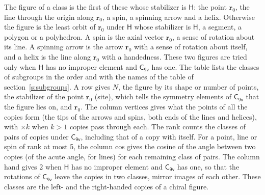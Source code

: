 \documentclass[10pt,a4paper]{article}
\numberwithin{equation}{section}
\newcommand{\grp}[1]{\mathsf{#1}}
\newcommand{\pointr}{\mathbf{r}}
\begin{document}
\leavevmode\label{n:head.figure}The figure of a class is the first of these whose stabilizer is $\grp{H}$: the point $\pointr_0$, the line through the origin along $\pointr_0$, a spin, a spinning arrow and a helix. Otherwise the figure is the least orbit of $\pointr_0$ under $\grp{H}$ whose stabilizer is $\grp{H}$, a segment, a polygon or a polyhedron. A spin is the axial vector $\pointr_0$, a sense of rotation about its line. A spinning arrow is the arrow $\pointr_0$ with a sense of rotation about itself, and a helix is the line along $\pointr_0$ with a handedness. These two figures are tried only when $\grp{H}$ has no improper element and $\grp{C_{9v}}$ has one. The table lists the classes of subgroups in the order and with the names of the table of section~\ref{s:subgroups}. \label{n:head.site}A row gives $N$, the figure by its shape or number of points, the stabilizer of the point $\pointr_0$ (site), which tells the symmetry elements of $\grp{C_{9v}}$ that the figure lies on, and $\pointr_0$. \label{n:head.vertices}The column vertices gives what the points of all the copies form (the tips of the arrows and spins, both ends of the lines and helices), with ${\times}k$ when $k > 1$ copies pass through each. \label{n:head.rank}The rank counts the classes of pairs of copies under $\grp{C_{9v}}$, including that of a copy with itself. \label{n:head.cos}For a point, line or spin of rank at most 5, the column cos gives the cosine of the angle between two copies (of the acute angle, for lines) for each remaining class of pairs. \label{n:head.hand}The column hand gives 2 when $\grp{H}$ has no improper element and $\grp{C_{9v}}$ has one, so that the rotations of $\grp{C_{9v}}$ leave the copies in two classes, mirror images of each other. These classes are the left- and the right-handed copies of a chiral figure.
\end{document}
